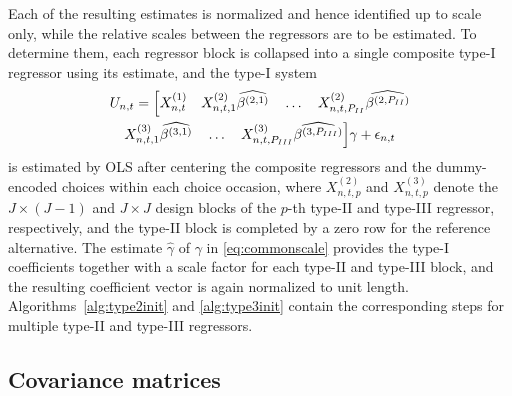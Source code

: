 \documentclass[preprint,12pt,authoryear]{elsarticle}
\begin{document}
Each of the resulting estimates is normalized and hence identified up to scale only, while the relative scales between the regressors are to be estimated. To determine them, each regressor block is collapsed into a single composite type-I regressor using its estimate, and the type-I system
%
\begin{multline}
    \label{eq:commonscale}
    U_{n,t} = \Bigl[ X^{(1)}_{n,t} \quad X^{(2)}_{n,t,1} \widehat{\beta^{(2,1)}} \quad \dots \quad X^{(2)}_{n,t,P_{II}} \widehat{\beta^{(2,P_{II})}} \\
    X^{(3)}_{n,t,1} \widehat{\beta^{(3,1)}} \quad \dots \quad X^{(3)}_{n,t,P_{III}} \widehat{\beta^{(3,P_{III})}} \Bigr] \gamma + \epsilon_{n,t}
\end{multline}
%
is estimated by OLS after centering the composite regressors and the dummy-encoded choices within each choice occasion, where $X^{(2)}_{n,t,p}$ and $X^{(3)}_{n,t,p}$ denote the $J \times (J-1)$ and $J \times J$ design blocks of the $p$-th type-II and type-III regressor, respectively, and the type-II block is completed by a zero row for the reference alternative. The estimate $\hat{\gamma}$ of $\gamma$ in \eqref{eq:commonscale} provides the type-I coefficients together with a scale factor for each type-II and type-III block, and the resulting coefficient vector is again normalized to unit length. Algorithms~\ref{alg:type2init} and \ref{alg:type3init} contain the corresponding steps for multiple type-II and type-III regressors.

\subsection{Covariance matrices}\label{sec:covariance}
\end{document}
